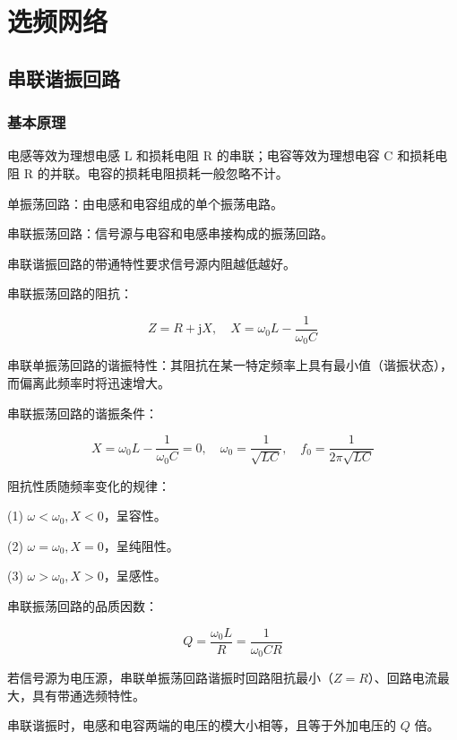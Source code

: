 \chapter{选频网络}

\section{串联谐振回路}

\subsection{基本原理}

电感等效为理想电感 L 和损耗电阻 R 的串联；电容等效为理想电容 C 和损耗电阻 R 的并联。电容的损耗电阻损耗一般忽略不计。

单振荡回路：由电感和电容组成的单个振荡电路。

串联振荡回路：信号源与电容和电感串接构成的振荡回路。

串联谐振回路的带通特性要求信号源内阻越低越好。

串联振荡回路的阻抗：

\begin{equation}
    Z = R + \text{j}X, \quad X = \omega_0 L - \frac{1}{\omega_0 C}
\end{equation}

串联单振荡回路的谐振特性：其阻抗在某一特定频率上具有最小值（谐振状态），而偏离此频率时将迅速增大。

串联振荡回路的谐振条件：

\begin{equation}
    X = \omega_0 L - \frac{1}{\omega_0 C} = 0, \quad \omega_0 = \frac{1}{\sqrt{LC}}, \quad f_0 = \frac{1}{2\pi \sqrt{LC}}
\end{equation}

阻抗性质随频率变化的规律：

(1) $\omega < \omega_0, X < 0$，呈容性。

(2) $\omega = \omega_0, X = 0$，呈纯阻性。

(3) $\omega > \omega_0, X > 0$，呈感性。

串联振荡回路的品质因数：

\begin{equation}
    Q = \frac{\omega_0 L}{R} = \frac{1}{\omega_0 C R}
\end{equation}

若信号源为电压源，串联单振荡回路谐振时回路阻抗最小（$Z = R$）、回路电流最大，具有带通选频特性。

串联谐振时，电感和电容两端的电压的模大小相等，且等于外加电压的 $Q$ 倍。


